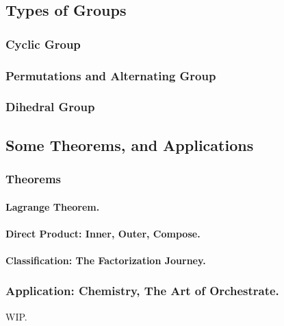 \clearpage
\subsection{Types of Groups}

\subsubsection{Cyclic Group}

\subsubsection{Permutations and Alternating Group}

\subsubsection{Dihedral Group}
\subsection{Some Theorems, and Applications}
\subsubsection{Theorems}
\paragraph{Lagrange Theorem.}
\paragraph{Direct Product: Inner, Outer, Compose.}
\paragraph{Classification: The Factorization Journey.}

\subsubsection{Application: Chemistry, The Art of Orchestrate.}
WIP.